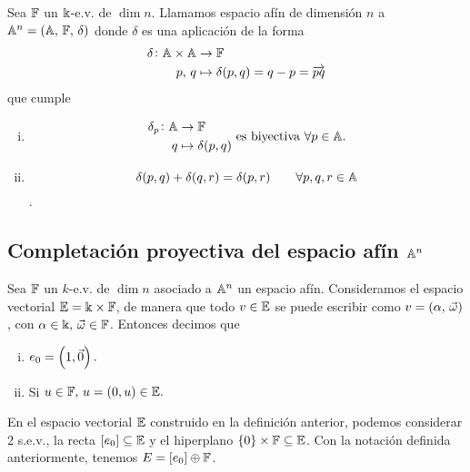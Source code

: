 \begin{obs}
  Sea $\mathbb{F}$ un $\Bbbk$-e.v. de $\dim n$. Llamamos espacio afín de dimensión $n$ a
  $\mathbb{A}^n = \left( \mathbb{A},\, \mathbb{F},\, \delta \right)$ donde $\delta$ es una aplicación de la forma
  \[
    \begin{aligned}
      \delta \colon \mathbb{A} \times \mathbb{A} & \to \mathbb{F}  \\
      p,\, q &\mapsto \delta (p, q) = q - p = \overrightarrow{pq}
    \end{aligned}
  \]
  que cumple
  \begin{enumerate}[i)]
    \item 
      \[
        \begin{aligned}
          \delta_p \colon \mathbb{A} & \to \mathbb{F}  \\
          q &\mapsto \delta (p, q)
        \end{aligned}
        \text{ es biyectiva } \forall p \in \mathbb{A}.
      \]
    \item \[\delta(p, q) + \delta(q, r) = \delta(p,r) \qquad \forall p, q, r \in \mathbb{A}\].
  \end{enumerate}
\end{obs}

\subsection{Completación proyectiva del espacio afín $\mathbb{A}^n$}

\begin{defi}
  Sea $\mathbb{F}$ un $k$-e.v. de $\dim n$ asociado a $\mathbb{A}^n$ un espacio afín. Consideramos
  el espacio vectorial $\mathbb{E} = \Bbbk \times \mathbb{F}$, de manera que todo $v \in \mathbb{E}$ se puede 
  escribir como $v = \left( \alpha, \, \vec{\omega} \right)$, con $\alpha \in \Bbbk, \, 
  \vec{\omega} \in \mathbb{F}$. Entonces decimos que
  \begin{enumerate}[i)]
    \item $e_0 = \left(1, \vec{0}\right).$
    \item Si $u \in \mathbb{F}, \, u = \left( 0, u \right) \in \mathbb{E}.$
  \end{enumerate}
\end{defi}

\begin{obs}
  En el espacio vectorial $\mathbb{E}$ construido en la definición anterior,
  podemos considerar 2 s.e.v., la recta $[e_0] \subseteq \mathbb{E}$ y el hiperplano
  $\{0\} \times \mathbb{F} \subseteq \mathbb{E}$. Con la notación definida anteriormente,
  tenemos $E = [e_0] \oplus \mathbb{F}$.
\end{obs}

